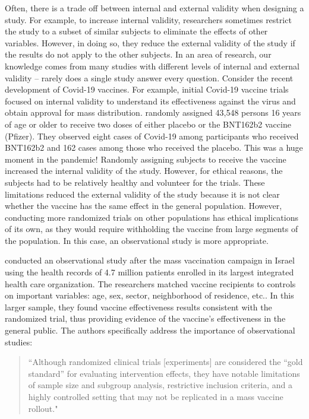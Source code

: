 \documentclass[]{book}
\begin{document}
Often, there is a trade off between internal and external validity when designing a study. For example, to increase internal validity, researchers sometimes restrict the study to a subset of similar subjects to eliminate the effects of other variables. However, in doing so, they reduce the external validity of the study if the results do not apply to the other subjects. In an area of research, our knowledge comes from many studies with different levels of internal and external validity -- rarely does a single study answer every question. Consider the recent development of Covid-19 vaccines. For example, initial Covid-19 vaccine trials focused on internal validity to understand its effectiveness against the virus and obtain approval for mass distribution. \citet{polack2020safety} randomly assigned 43,548 persons 16 years of age or older to receive two doses of either placebo or the BNT162b2 vaccine (Pfizer). They observed eight cases of Covid-19 among participants who received BNT162b2 and 162 cases among those who received the placebo. This was a huge moment in the pandemic! Randomly assigning subjects to receive the vaccine increased the internal validity of the study. However, for ethical reasons, the subjects had to be relatively healthy and volunteer for the trials. These limitations reduced the external validity of the study because it is not clear whether the vaccine has the same effect in the general population. However, conducting more randomized trials on other populations has ethical implications of its own, as they would require withholding the vaccine from large segments of the population. In this case, an observational study is more appropriate.

\citet{dagan2021bnt162b2} conducted an observational study after the mass vaccination campaign in Israel using the health records of 4.7 million patients enrolled in its largest integrated health care organization. The researchers matched vaccine recipients to controls on important variables: age, sex, sector, neighborhood of residence, etc.. In this larger sample, they found vaccine effectiveness results consistent with the randomized trial, thus providing evidence of the vaccine's effectiveness in the general public. The authors specifically address the importance of observational studies:

\begin{quote}
``Although randomized clinical trials {[}experiments{]} are considered the ``gold standard'' for evaluating intervention effects, they have notable limitations of sample size and subgroup analysis, restrictive inclusion criteria, and a highly controlled setting that may not be replicated in a mass vaccine rollout."
\end{quote}
\end{document}
